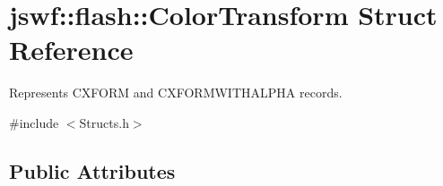 \hypertarget{structjswf_1_1flash_1_1_color_transform}{\section{jswf\+:\+:flash\+:\+:Color\+Transform Struct Reference}
\label{structjswf_1_1flash_1_1_color_transform}
}


Represents {\ttfamily C\+X\+F\+O\+R\+M} and {\ttfamily C\+X\+F\+O\+R\+M\+W\+I\+T\+H\+A\+L\+P\+H\+A} records.  




{\ttfamily \#include $<$Structs.\+h$>$}

\subsection*{Public Attributes}
